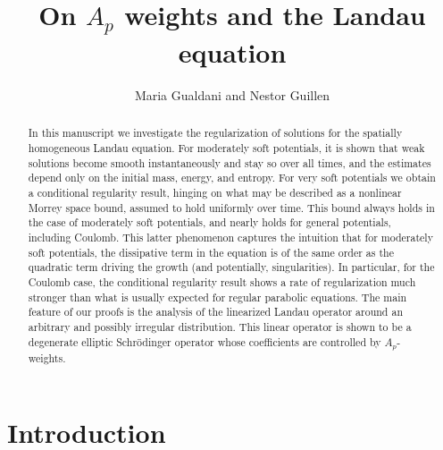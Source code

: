 \documentclass[12pt,american]{amsart}
\title{On $A_p$ weights and the Landau equation}
\numberwithin{equation}{section}
\theoremstyle{plain}
\theoremstyle{definition}                  %
\begin{document}
	
\author{Maria Gualdani and Nestor Guillen}	
	
\begin{abstract}
  In this manuscript we investigate the regularization of solutions for the spatially homogeneous Landau equation. For moderately soft potentials, it is shown that weak solutions become smooth instantaneously and stay so over all times, and the estimates depend only on the initial mass, energy, and entropy. For very soft potentials we obtain a conditional regularity result, hinging on what may be described as a nonlinear Morrey space bound, assumed to hold uniformly over time. This bound always holds in the case of moderately soft potentials, and nearly holds for general potentials, including Coulomb. This latter phenomenon captures the intuition that for moderately soft potentials, the dissipative term in the equation is of the same order as the quadratic term driving the growth (and potentially, singularities). In particular, for the Coulomb case, the conditional regularity result shows a rate of regularization much stronger than what is usually expected for regular parabolic equations. The main feature of our proofs is the analysis of the linearized Landau operator around an arbitrary and possibly irregular distribution. This linear operator is shown to be a degenerate elliptic Schr\"odinger operator whose coefficients are controlled by $A_p$-weights. 
\end{abstract}


\maketitle

\baselineskip=14pt
\pagestyle{headings}		%


\section{Introduction}\label{section:introduction}
\end{document}
